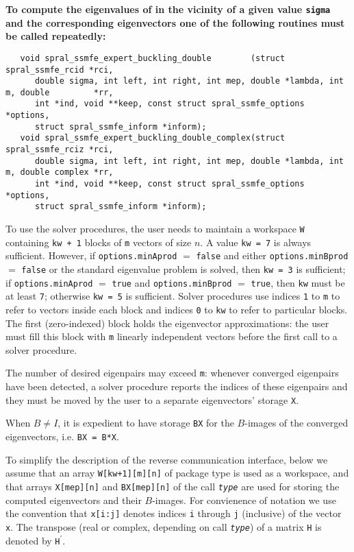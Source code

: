 \medskip
\noindent
{\bf
To compute the eigenvalues of 
in the vicinity of a given value {\tt sigma}
and the corresponding eigenvectors 
one of the following routines must be called repeatedly:
}
\begin{verbatim}
   void spral_ssmfe_expert_buckling_double        (struct spral_ssmfe_rcid *rci,
      double sigma, int left, int right, int mep, double *lambda, int m, double         *rr,
      int *ind, void **keep, const struct spral_ssmfe_options *options,
      struct spral_ssmfe_inform *inform);
   void spral_ssmfe_expert_buckling_double_complex(struct spral_ssmfe_rciz *rci,
      double sigma, int left, int right, int mep, double *lambda, int m, double complex *rr,
      int *ind, void **keep, const struct spral_ssmfe_options *options,
      struct spral_ssmfe_inform *inform);
\end{verbatim}

\medskip
To use the solver procedures,
the user needs to maintain a workspace {\tt W} containing
{\tt kw + 1} blocks of {\tt m} vectors of size $n$.
A value {\tt kw = 7} is always sufficient. 
However, if {\tt options.minAprod} $=$ {\tt false}
and either {\tt options.minBprod} $=$ {\tt false} or 
the standard eigenvalue problem  is solved,
then {\tt kw = 3} is sufficient; 
if 
{\tt options.minAprod} $=$ {\tt true} and
{\tt options.minBprod} $=$ {\tt true},
then {\tt kw} must be at least {\tt 7};
otherwise {\tt kw = 5} is sufficient.
Solver procedures
use indices {\tt 1} to {\tt m} 
to refer to vectors inside each block
and indices {\tt 0} to {\tt kw} 
to refer to particular blocks.
The first (zero-indexed) block holds the eigenvector approximations:
the user must fill this block with 
{\tt m} linearly independent vectors before the first call
to a solver procedure.

The number of desired eigenpairs may exceed {\tt m}:
whenever converged eigenpairs have been detected,
a solver procedure reports the indices of these eigenpairs
and they must be moved by the user
to a separate eigenvectors' storage {\tt X}.

When $B \ne I$,
it is expedient to 
have %
storage {\tt BX}
for the $B$-images of the converged eigenvectors,
i.e. {\tt BX = B*X}.

To simplify the description of the
reverse communication interface,
below we assume that an array
{\tt W[kw+1][m][n]} of package type
is used as a workspace,
and that arrays {\tt X[mep][n]} and {\tt BX[mep][n]} of the call
\texttt{\textit{type}}
are used for storing the computed eigenvectors
and their $B$-images.
For convienence of notation we use the convention that \texttt{x[i:j]}
denotes indices {\tt i} through {\tt j} (inclusive) of the vector {\tt x}.
The transpose (real or complex, depending on call \texttt{\textit{type}})
of a matrix {\tt H} 
is denoted by {\tt H}$^\prime$.

